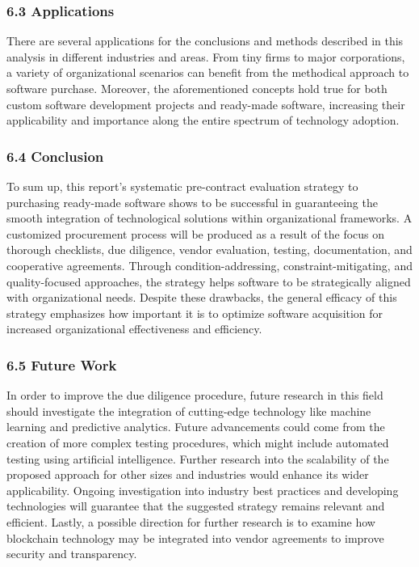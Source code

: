 \documentclass[letterpaper, 11pt]{report}
\begin{document}
{\subsubsection*{6.3 Applications}
\normalsize{There are several applications for the conclusions and methods described in this analysis in different industries and areas. From tiny firms to major corporations, a variety of organizational scenarios can benefit from the methodical approach to software purchase. Moreover, the aforementioned concepts hold true for both custom software development projects and ready-made software, increasing their applicability and importance along the entire spectrum of technology adoption.
}

\subsubsection*{6.4 Conclusion}
\normalsize{To sum up, this report's systematic pre-contract evaluation strategy to purchasing ready-made software shows to be successful in guaranteeing the smooth integration of technological solutions within organizational frameworks. A customized procurement process will be produced as a result of the focus on thorough checklists, due diligence, vendor evaluation, testing, documentation, and cooperative agreements. Through condition-addressing, constraint-mitigating, and quality-focused approaches, the strategy helps software to be strategically aligned with organizational needs. Despite these drawbacks, the general efficacy of this strategy emphasizes how important it is to optimize software acquisition for increased organizational effectiveness and efficiency.
}

\subsubsection*{6.5 Future Work}
\normalsize{In order to improve the due diligence procedure, future research in this field should investigate the integration of cutting-edge technology like machine learning and predictive analytics. Future advancements could come from the creation of more complex testing procedures, which might include automated testing using artificial intelligence. Further research into the scalability of the proposed approach for other sizes and industries would enhance its wider applicability. Ongoing investigation into industry best practices and developing technologies will guarantee that the suggested strategy remains relevant and efficient. Lastly, a possible direction for further research is to examine how blockchain technology may be integrated into vendor agreements to improve security and transparency.
}

}
\end{document}
